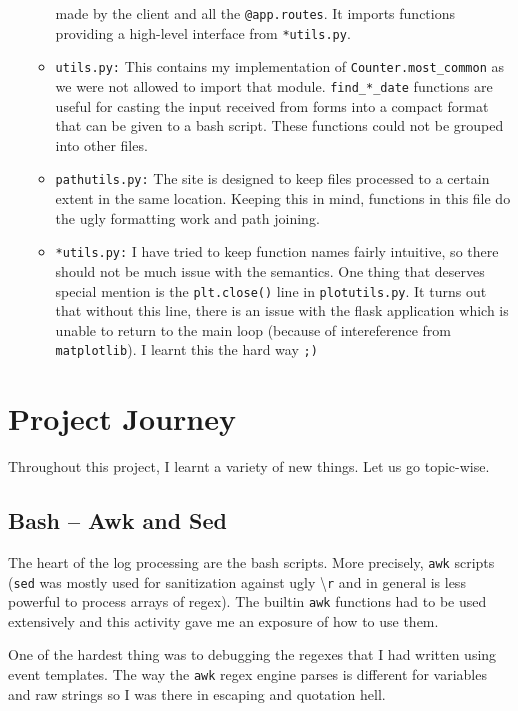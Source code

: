 \documentclass[11pt]{scrartcl}
\begin{document}
\begin{itemize}
\begin{itemize}
        made by the client and all the \texttt{@app.routes}. It imports
        functions providing a high-level interface from \texttt{*utils.py}.
      \item \texttt{utils.py:} This contains my implementation of
        \texttt{Counter.most\_common} as we were not allowed to import that
        module. \texttt{find\_*\_date} functions are useful for casting the
        input received from forms into a compact format that can be given to a
        bash script. These functions could not be grouped into other files.
      \item \texttt{pathutils.py:} The site is designed to keep files processed
        to a certain extent in the same location. Keeping this in mind,
        functions in this file do the ugly formatting work and path joining.
      \item \texttt{*utils.py:} I have tried to keep function names fairly
        intuitive, so there should not be much issue with the semantics. One
        thing that deserves special mention is the \texttt{plt.close()} line in
        \texttt{plotutils.py}. It turns out that without this line, there is an
        issue with the flask application which is unable to return to the main
        loop (because of intereference from \texttt{matplotlib}). I learnt this
        the hard way \texttt{;)}

    \end{itemize}
\end{itemize}

\newpage

\section{Project Journey}
Throughout this project, I learnt a variety of new things. Let us go topic-wise.

\subsection{Bash -- Awk and Sed}

The heart of the log processing are the bash scripts. More precisely,
\texttt{awk} scripts (\texttt{sed} was mostly used for sanitization against ugly
\textbackslash\texttt{r} and in general is less powerful to process arrays of regex).
The builtin \texttt{awk} functions had to be used extensively and this activity
gave me an exposure of how to use them. 

One of the hardest thing was to
debugging the regexes that I had written using event templates. The way the
\texttt{awk} regex engine parses is different for variables and raw
strings so I was there in escaping and quotation hell. 
\end{document}
